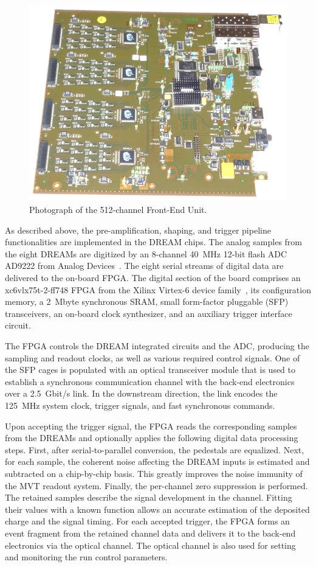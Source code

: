 \begin{figure}[htb]
 \includegraphics[width=1.0\columnwidth,keepaspectratio]{images/electronics_fig3.png}
 \caption{Photograph of the 512-channel Front-End Unit.}
 \label{fig:mm-e_3}
\end{figure}

As described above, the pre-amplification, shaping, and trigger pipeline functionalities are implemented in the DREAM
chips. The analog samples from the eight DREAMs are digitized by an 8-channel 40~MHz 12-bit flash ADC AD9222 from
Analog Devices~\cite{ADC}. The eight serial streams of digital data are delivered to the on-board FPGA. The digital
section of the board comprises an xc6vlx75t-2-ff748 FPGA from the Xilinx Virtex-6 device family~\cite{XIL}, its
configuration memory, a 2~Mbyte synchronous SRAM, small form-factor pluggable (SFP) transceivers, an on-board clock
synthesizer, and an auxiliary trigger interface circuit.

The FPGA controls the DREAM integrated circuits and the ADC, producing the sampling and readout clocks, as well as
various required control signals. One of the SFP cages is populated with an optical transceiver module that is used to
establish a synchronous communication channel with the back-end electronics over a 2.5~Gbit/s link. In the downstream
direction, the link encodes the 125~MHz system clock, trigger signals, and fast synchronous commands.

Upon accepting the trigger signal, the FPGA reads the corresponding samples from the DREAMs and optionally applies the
following digital data processing steps. First, after serial-to-parallel conversion, the pedestals are equalized. Next, for
each sample, the coherent noise affecting the DREAM inputs is estimated and subtracted on a chip-by-chip basis. This
greatly improves the noise immunity of the MVT readout system. Finally, the per-channel zero suppression is performed.
The retained samples describe the signal development in the channel. Fitting their values with a known function allows an
accurate estimation of the deposited charge and the signal timing. For each accepted trigger, the FPGA forms an event
fragment from the retained channel data and delivers it to the back-end electronics via the optical channel. The optical
channel is also used for setting and monitoring the run control parameters.

